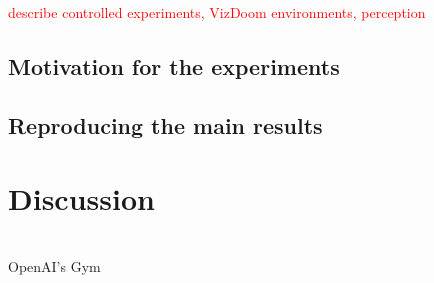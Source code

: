 \documentclass{article}
\begin{document}

 \textcolor{red}{describe controlled experiments, VizDoom environments, perception}


\subsection{Motivation for the experiments}
\subsection{Reproducing the main results}



\section{Discussion}


\citet{mnih2015} \\
OpenAI's Gym \citep{gym} \\
\citep{pytorch} \\
\citet{amiranashvili2018analyzing} \\
\citet{pmlr-v48-mniha16}

\pagebreak

\small


\end{document}
